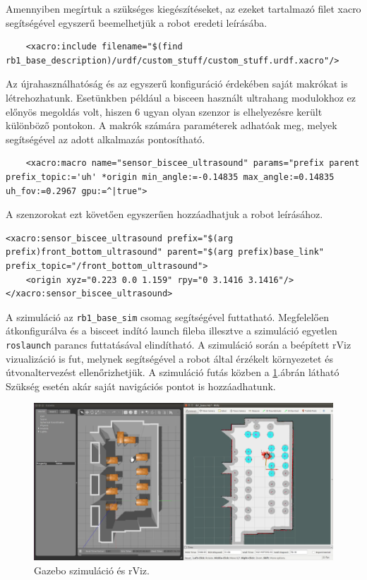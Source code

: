 
Amennyiben megírtuk a szükséges kiegészítéseket, az ezeket tartalmazó filet xacro segítségével egyszerű beemelhetjük a robot eredeti leírásába.
\begin{lstlisting}
    <xacro:include filename="$(find rb1_base_description)/urdf/custom_stuff/custom_stuff.urdf.xacro"/>
\end{lstlisting}
Az újrahasználhatóság és az egyszerű konfiguráció érdekében saját makrókat is létrehozhatunk. Esetünkben például a bisceen használt ultrahang modulokhoz ez előnyös megoldás volt, hiszen 6 ugyan olyan szenzor is elhelyezésre került különböző pontokon. A makrók számára paraméterek adhatóak meg, melyek segítségével az adott alkalmazás pontosítható.
\begin{lstlisting}
    <xacro:macro name="sensor_biscee_ultrasound" params="prefix parent prefix_topic:='uh' *origin min_angle:=-0.14835 max_angle:=0.14835 uh_fov:=0.2967 gpu:=^|true">
\end{lstlisting}
A szenzorokat ezt követően egyszerűen hozzáadhatjuk a robot leírásához.
\begin{lstlisting}
<xacro:sensor_biscee_ultrasound prefix="$(arg prefix)front_bottom_ultrasound" parent="$(arg prefix)base_link" prefix_topic="/front_bottom_ultrasound">
    <origin xyz="0.223 0.0 1.159" rpy="0 3.1416 3.1416"/>
</xacro:sensor_biscee_ultrasound>
\end{lstlisting}
A szimuláció az \lstinline{rb1_base_sim} csomag segítségével futtatható. Megfelelően átkonfigurálva és a bisceet indító launch fileba illesztve a szimuláció egyetlen \lstinline{roslaunch} parancs futtatásával elindítható. A szimuláció során a beépített rViz\cite{noauthor_rviz_nodate} vizualizáció is fut, melynek segítségével a robot által érzékelt környezetet és útvonaltervezést ellenőrizhetjük. A szimuláció futás közben a \ref{fig:simulation_gazebo_and_rviz}.ábrán látható Szükség esetén akár saját navigációs pontot is hozzáadhatunk.

\begin{figure}
    \centering
    \includegraphics[width=\linewidth]{figures/simulation_gazebo_and_rviz.png}
    \caption{Gazebo szimuláció és rViz.}
    \label{fig:simulation_gazebo_and_rviz}
\end{figure}

